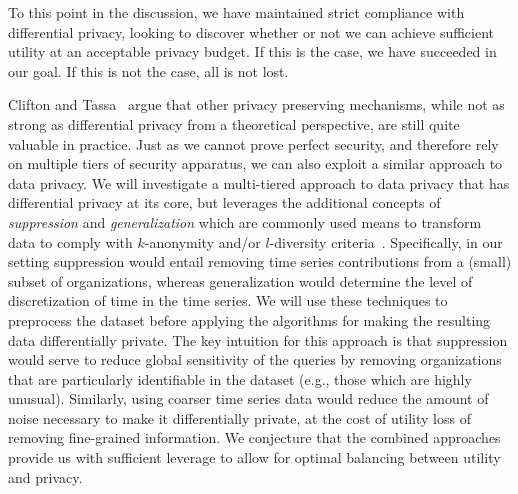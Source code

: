 To this point in the discussion, we have maintained strict compliance
with differential privacy, looking to discover whether or not we can
achieve sufficient utility at an acceptable privacy budget.  If this is
the case, we have succeeded in our goal.  If this is not the case, all
is not lost.

Clifton and Tassa~\cite{ct13} argue that other privacy preserving
mechanisms, while not as strong as differential privacy from a
theoretical perspective, are still quite valuable in practice.
Just as we cannot prove perfect security, and therefore rely on multiple
tiers of security apparatus, we can also exploit a similar approach
to data privacy.  
We will investigate a multi-tiered approach to data
privacy that has differential privacy at its core, but leverages the
additional concepts of \emph{suppression} and \emph{generalization}
which are commonly used means to transform data to comply with
$k$-anonymity and/or $l$-diversity criteria~\cite{mkgv07}.
Specifically, in our setting suppression would entail removing time
series contributions from a (small) subset of organizations, whereas
generalization would determine the level of discretization of time in
the time series.
We will use these techniques to preprocess the dataset
before applying the algorithms for making the resulting data
differentially private.
The key intuition for this approach is that suppression would serve to
reduce global sensitivity of the queries by removing organizations that are
particularly identifiable in the dataset (e.g., those which are highly
unusual).
Similarly, using coarser time series data would reduce the amount of
noise necessary to make it differentially private, at the cost of utility loss
of removing fine-grained information.
We conjecture that the combined approaches provide us with sufficient
leverage to allow for optimal balancing between utility and privacy.


